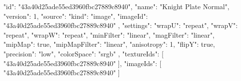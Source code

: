 {
  "id": "43a40d25ade55ed3960fbc27889c8940",
  "name": "Knight Plate Normal",
  "version": 1,
  "source": {
    "kind": "image",
    "imageId": "43a40d25ade55ed3960fbc27889c8940"
  },
  "settings": {
    "wrapU": "repeat",
    "wrapV": "repeat",
    "wrapW": "repeat",
    "minFilter": "linear",
    "magFilter": "linear",
    "mipMap": true,
    "mipMapFilter": "linear",
    "anisotropy": 1,
    "flipY": true,
    "precision": "low",
    "colorSpace": "srgb"
  },
  "textureIds": [
    "43a40d25ade55ed3960fbc27889c8940"
  ],
  "imageIds": [
    "43a40d25ade55ed3960fbc27889c8940"
  ]
}
